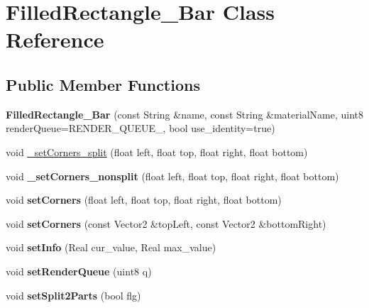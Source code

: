 \hypertarget{class_filled_rectangle___bar}{
\section{FilledRectangle\_\-Bar Class Reference}
\label{class_filled_rectangle___bar}
}
\subsection*{Public Member Functions}
\begin{DoxyCompactItemize}
\item 
\hypertarget{class_filled_rectangle___bar_a23fafdfd46ffb729ff425d2533cfd0a2}{
{\bfseries FilledRectangle\_\-Bar} (const String \&name, const String \&materialName, uint8 renderQueue=RENDER\_\-QUEUE\_, bool use\_\-identity=true)}
\label{class_filled_rectangle___bar_a23fafdfd46ffb729ff425d2533cfd0a2}

\item 
void \hyperlink{class_filled_rectangle___bar_aa78858db7f531d85e1936778753bed1d}{\_\-setCorners\_\-split} (float left, float top, float right, float bottom)
\item 
\hypertarget{class_filled_rectangle___bar_aeb8b3b87f21236293610576ebc1450b3}{
void {\bfseries \_\-setCorners\_\-nonsplit} (float left, float top, float right, float bottom)}
\label{class_filled_rectangle___bar_aeb8b3b87f21236293610576ebc1450b3}

\item 
\hypertarget{class_filled_rectangle___bar_add7e5f94fba8f8df5598c0cc36ad7f8a}{
void {\bfseries setCorners} (float left, float top, float right, float bottom)}
\label{class_filled_rectangle___bar_add7e5f94fba8f8df5598c0cc36ad7f8a}

\item 
\hypertarget{class_filled_rectangle___bar_a07a7bac6a4663705253f144f0c2a5775}{
void {\bfseries setCorners} (const Vector2 \&topLeft, const Vector2 \&bottomRight)}
\label{class_filled_rectangle___bar_a07a7bac6a4663705253f144f0c2a5775}

\item 
\hypertarget{class_filled_rectangle___bar_a73b5ed4c6ffcd462764913d5568451b6}{
void {\bfseries setInfo} (Real cur\_\-value, Real max\_\-value)}
\label{class_filled_rectangle___bar_a73b5ed4c6ffcd462764913d5568451b6}

\item 
\hypertarget{class_filled_rectangle___bar_a0db3881300ea21cf52bbf8d33bb0e029}{
void {\bfseries setRenderQueue} (uint8 q)}
\label{class_filled_rectangle___bar_a0db3881300ea21cf52bbf8d33bb0e029}

\item 
\hypertarget{class_filled_rectangle___bar_a80e41ebb209752d0ead4fa24704e6d3c}{
void {\bfseries setSplit2Parts} (bool flg)}
\label{class_filled_rectangle___bar_a80e41ebb209752d0ead4fa24704e6d3c}

\end{DoxyCompactItemize}


